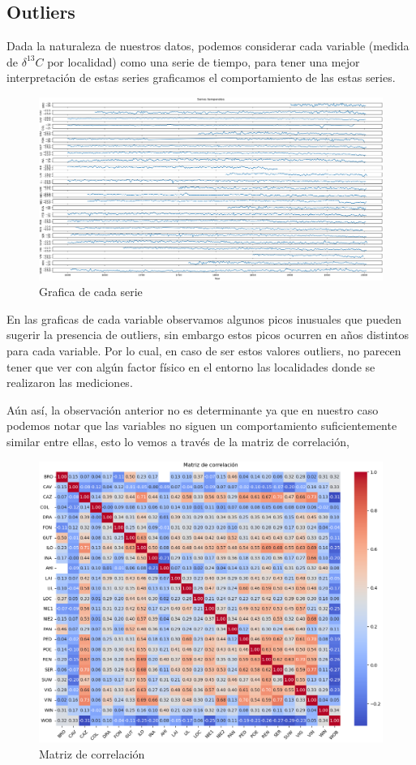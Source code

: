 \documentclass[a4paper,11pt]{article}
\begin{document}
\subsection*{Outliers}

Dada la naturaleza de nuestros datos, podemos considerar cada variable (medida
de $\delta^{13}C$ por localidad) como una serie de tiempo, para tener una mejor
interpretación de estas series graficamos el comportamiento de las estas series.

\begin{figure}[ht]
	\centering
	\includegraphics[width=0.95\linewidth]{figures/series.png}
	\caption{Grafica de cada serie}
	\label{}
\end{figure}

En las graficas de cada variable observamos algunos picos inusuales que pueden
sugerir la presencia de outliers, sin embargo estos picos ocurren en años
distintos para cada variable. Por lo cual, en caso de ser estos valores
outliers, no parecen tener que ver con algún factor físico en el entorno las
localidades donde se realizaron las mediciones.

Aún así, la observación anterior no es determinante ya que en nuestro caso
podemos notar que las variables no siguen un comportamiento suficientemente
similar entre ellas, esto lo vemos a través de la matriz de correlación,

\begin{figure}[ht]
	\centering
	\includegraphics[width=0.7\linewidth]{figures/correlacion.png}
	\caption{Matriz de correlación}
	\label{}
\end{figure}
\end{document}
